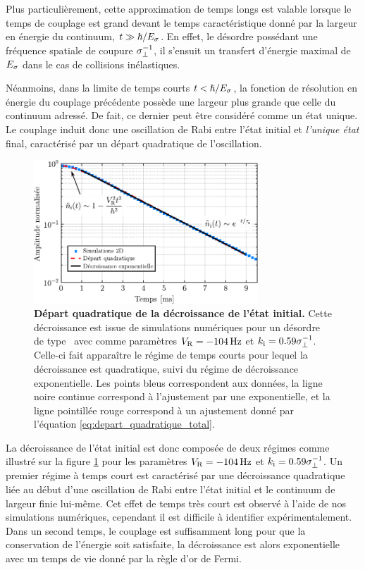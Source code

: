 Plus particulièrement, cette approximation de temps longs est valable lorsque le temps de couplage est grand devant le temps caractéristique donné par la largeur en énergie du continuum, $t\gg\hslash/E_{\sigma}$. En effet, le désordre possédant une fréquence spatiale de coupure $\sigma_{\perp}^{-1}$, il s'ensuit un transfert d'énergie maximal de $E_{\sigma}$ dans le cas de collisions inélastiques.

Néanmoins, dans la limite de temps courts $t<\hslash/E_{\sigma}$, la fonction de résolution en énergie du couplage précédente possède une largeur plus grande que celle du continuum adressé. De fait, ce dernier peut être considéré comme un état unique. Le couplage induit donc une oscillation de Rabi entre l'état initial et \emph{l'unique état} final, caractérisé par un départ quadratique de l'oscillation.

\begin{figure}
\centering
\includegraphics[width=0.75\textwidth]{Fig/TauS_PRL/depart_quadratique_taus.pdf}
\caption{\textbf{Départ quadratique de la décroissance de l'état initial.} Cette décroissance est issue de simulations numériques  pour un désordre de type \speckle\ avec comme paramètres $V_{\mathrm{R}}=\SI{-104}{\hertz}$ et $k_{\mathrm{i}}=0.59\sigma_{\perp}^{-1}$. Celle-ci fait apparaître le régime de temps courts pour lequel la décroissance est quadratique, suivi du régime de décroissance exponentielle. Les points bleus correspondent aux données, la ligne noire continue correspond à l'ajustement par une exponentielle, et la ligne pointillée rouge correspond à un ajustement donné par l'équation \ref{eq:depart_quadratique_total}. }
\label{fig:depart_quadratique_taus}
\end{figure}

La décroissance de l'état initial est donc composée de deux régimes comme illustré sur la figure \ref{fig:depart_quadratique_taus} pour les paramètres $V_{\mathrm{R}}=\SI{-104}{\hertz}$ et $k_{\mathrm{i}}=0.59\sigma_{\perp}^{-1}$. Un premier régime à temps court est caractérisé par une décroissance quadratique liée au début d'une oscillation de Rabi entre l'état initial et le continuum de largeur finie lui-même. Cet effet de temps très court est observé à l'aide de nos simulations numériques, cependant il est difficile à identifier expérimentalement. Dans un second temps, le couplage est suffisamment long pour que la conservation de l'énergie soit satisfaite, la décroissance est alors exponentielle avec un temps de vie donné par la règle d'or de Fermi.

